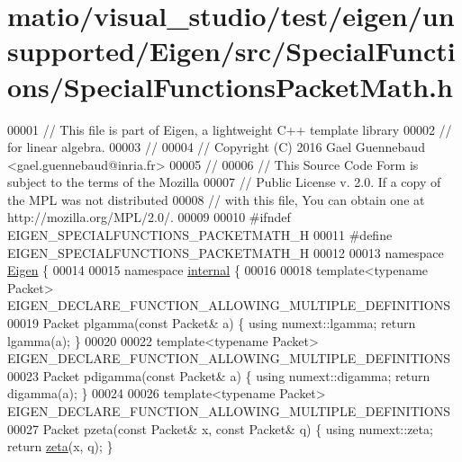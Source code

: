 \hypertarget{matio_2visual__studio_2test_2eigen_2unsupported_2_eigen_2src_2_special_functions_2_special_functions_packet_math_8h_source}{}\section{matio/visual\+\_\+studio/test/eigen/unsupported/\+Eigen/src/\+Special\+Functions/\+Special\+Functions\+Packet\+Math.h}
\label{matio_2visual__studio_2test_2eigen_2unsupported_2_eigen_2src_2_special_functions_2_special_functions_packet_math_8h_source}

\begin{DoxyCode}
00001 \textcolor{comment}{// This file is part of Eigen, a lightweight C++ template library}
00002 \textcolor{comment}{// for linear algebra.}
00003 \textcolor{comment}{//}
00004 \textcolor{comment}{// Copyright (C) 2016 Gael Guennebaud <gael.guennebaud@inria.fr>}
00005 \textcolor{comment}{//}
00006 \textcolor{comment}{// This Source Code Form is subject to the terms of the Mozilla}
00007 \textcolor{comment}{// Public License v. 2.0. If a copy of the MPL was not distributed}
00008 \textcolor{comment}{// with this file, You can obtain one at http://mozilla.org/MPL/2.0/.}
00009 
00010 \textcolor{preprocessor}{#ifndef EIGEN\_SPECIALFUNCTIONS\_PACKETMATH\_H}
00011 \textcolor{preprocessor}{#define EIGEN\_SPECIALFUNCTIONS\_PACKETMATH\_H}
00012 
00013 \textcolor{keyword}{namespace }\hyperlink{namespace_eigen}{Eigen} \{
00014 
00015 \textcolor{keyword}{namespace }\hyperlink{namespaceinternal}{internal} \{
00016 
00018 \textcolor{keyword}{template}<\textcolor{keyword}{typename} Packet> EIGEN\_DECLARE\_FUNCTION\_ALLOWING\_MULTIPLE\_DEFINITIONS
00019 Packet plgamma(\textcolor{keyword}{const} Packet& a) \{ \textcolor{keyword}{using} numext::lgamma; \textcolor{keywordflow}{return} lgamma(a); \}
00020 
00022 \textcolor{keyword}{template}<\textcolor{keyword}{typename} Packet> EIGEN\_DECLARE\_FUNCTION\_ALLOWING\_MULTIPLE\_DEFINITIONS
00023 Packet pdigamma(\textcolor{keyword}{const} Packet& a) \{ \textcolor{keyword}{using} numext::digamma; \textcolor{keywordflow}{return} digamma(a); \}
00024 
00026 \textcolor{keyword}{template}<\textcolor{keyword}{typename} Packet> EIGEN\_DECLARE\_FUNCTION\_ALLOWING\_MULTIPLE\_DEFINITIONS
00027 Packet pzeta(\textcolor{keyword}{const} Packet& x, \textcolor{keyword}{const} Packet& q) \{ \textcolor{keyword}{using} numext::zeta; \textcolor{keywordflow}{return} \hyperlink{namespace_eigen_af9555e27540da78d2c4bdd17d3b750b1}{zeta}(x, q); \}

\end{DoxyCode}

